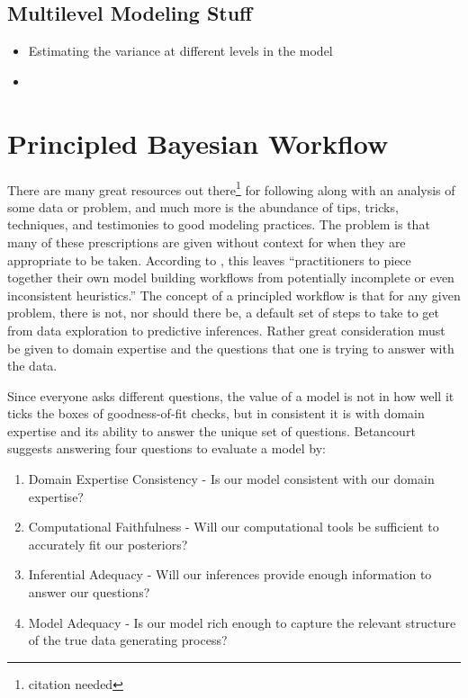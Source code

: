 \documentclass[11pt, oneside]{book}
\providecommand{\tightlist}{%
  \setlength{\itemsep}{0pt}\setlength{\parskip}{0pt}}
\begin{document}
\hypertarget{multilevel-modeling-stuff}{%
\section{Multilevel Modeling Stuff}\label{multilevel-modeling-stuff}}

\begin{itemize}
\item
  Estimating the variance at different levels in the model
\item
\end{itemize}

\hypertarget{workflow}{%
\chapter{Principled Bayesian Workflow}\label{workflow}}

There are many great resources out there\footnote{citation needed} for following along with an analysis of some data or problem, and much more is the abundance of tips, tricks, techniques, and testimonies to good modeling practices. The problem is that many of these prescriptions are given without context for when they are appropriate to be taken. According to \citet{betancourt2020}, this leaves ``practitioners to piece together their own model building workflows from potentially incomplete or even inconsistent heuristics.'' The concept of a principled workflow is that for any given problem, there is not, nor should there be, a default set of steps to take to get from data exploration to predictive inferences. Rather great consideration must be given to domain expertise and the questions that one is trying to answer with the data.

Since everyone asks different questions, the value of a model is not in how well it ticks the boxes of goodness-of-fit checks, but in consistent it is with domain expertise and its ability to answer the unique set of questions. Betancourt suggests answering four questions to evaluate a model by:

\begin{enumerate}
\def\labelenumi{\arabic{enumi}.}
\tightlist
\item
  Domain Expertise Consistency - Is our model consistent with our domain expertise?
\item
  Computational Faithfulness - Will our computational tools be sufficient to accurately fit our posteriors?
\item
  Inferential Adequacy - Will our inferences provide enough information to answer our questions?
\item
  Model Adequacy - Is our model rich enough to capture the relevant structure of the true data generating process?
\end{enumerate}
\end{document}
